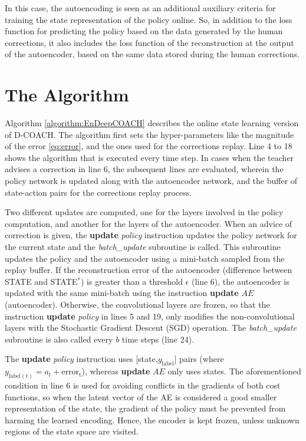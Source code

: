 In this case, the autoencoding is seen as an additional auxiliary criteria for training the state representation of the policy online. So, in addition to the loss function for predicting the policy based on the data generated by the human corrections, it also includes the loss function of the reconstruction at the output of the autoencoder, based on the same data stored during the human corrections. 

\section{The Algorithm}
Algorithm \ref{algorithm:EnDeepCOACH} describes the online state learning version of D-COACH. The algorithm first sets the hyper-parameters like the magnitude of the error \eqref{eq:error}, and the ones used for the corrections replay. Line 4 to 18 shows the algorithm that is executed every time step. In cases when the teacher advises a correction in line 6, the subsequent lines are evaluated, wherein the policy network is updated along with the autoencoder network, and the buffer of state-action pairs for the corrections replay process.

Two different updates are computed, one for the layers involved in the policy computation, and another for the layers of the autoencoder. When an advice of correction is given, the \textbf{update} \emph{policy} instruction updates the policy network for the current state and the \emph{batch\_update} subroutine is called. This subroutine updates the policy and the autoencoder using a mini-batch sampled from the replay buffer. If the reconstruction error of the autoencoder (difference between STATE and STATE$^{*}$) is greater than a threshold $\epsilon$ (line 6), the autoencoder is updated with the same mini-batch using the instruction \textbf{update} $AE$ (autoencoder). Otherwise, the convolutional layers are frozen, so that the instruction \textbf{update} \emph{policy} in lines 5 and 19, only modifies the non-convolutional layers with the Stochastic Gradient Descent (SGD) operation. The \emph{batch\_update} subroutine is also called every $b$ time steps (line 24).

 The \textbf{update} \emph{policy} instruction uses [state,$y_\mathrm{label}$] pairs (where $y_\mathrm{label(t)}=a_{t}+\mathrm{error_{t}}$), whereas \textbf{update} $AE$ only uses states. The aforementioned condition in line 6 is used for avoiding conflicts in the gradients of both cost functions, so when the latent vector of the AE is considered a good smaller representation of the state, the gradient of the policy must be prevented from harming the learned encoding. Hence, the encoder is kept frozen, unless unknown regions of the state space are visited. 


